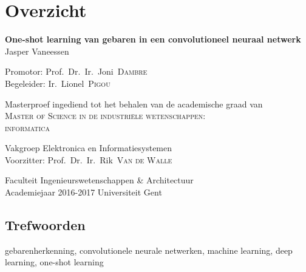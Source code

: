 
\newpage
{
\setlength{\baselineskip}{12pt}
\setlength{\parindent}{0pt}
\setlength{\parskip}{6pt}

\chapter{Overzicht}
\begin{center}

\vspace{5mm}
\renewcommand{\baselinestretch}{1.1}
\noindent \textbf{
One-shot learning van gebaren in een convolutioneel neuraal netwerk
} \\
\renewcommand{\baselinestretch}{1.3}
\normalsize
Jasper Vaneessen
\vspace{5mm}
\end{center}

Promotor: Prof.~Dr.~Ir.~Joni~\textsc{Dambre}\\
Begeleider: Ir.~Lionel~\textsc{Pigou}

\vspace{5mm}

Masterproef ingediend tot het behalen van de academische graad van\\
\textsc{Master of Science in de industri\"ele wetenschappen:\\ informatica}

\vspace{5mm}

Vakgroep Elektronica en Informatiesystemen\\
Voorzitter: Prof.~Dr.~Ir.~Rik~\textsc{Van de Walle}

\vspace{5mm}

Faculteit Ingenieurswetenschappen \& Architectuur\\
Academiejaar 2016-2017
Universiteit Gent





\section*{Trefwoorden}
gebarenherkenning, convolutionele neurale netwerken, machine learning, deep learning, one-shot learning
}

\newpage %
